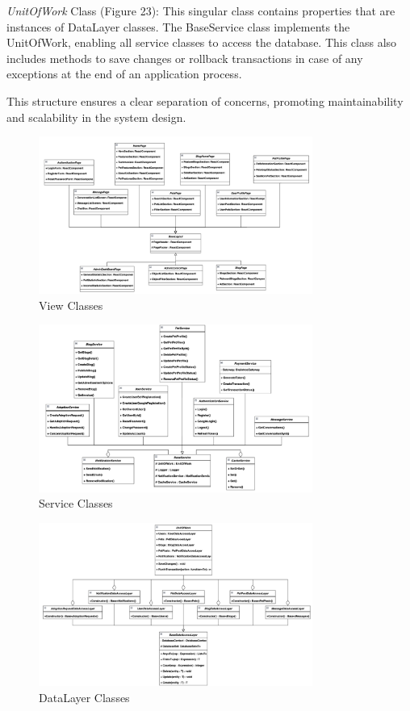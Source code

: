 \emph{UnitOfWork} Class (Figure 23): This singular class contains
properties that are instances of DataLayer classes. The BaseService
class implements the UnitOfWork, enabling all service classes to access
the database. This class also includes methods to save changes or
rollback transactions in case of any exceptions at the end of an
application process.

This structure ensures a clear separation of concerns, promoting
maintainability and scalability in the system design.

\begin{figure}[H]
  \centering
  \includegraphics[angle=-90,width=0.8\textwidth]{Figures/view_class.png}
  \caption{View Classes}
  \label{fig:view-classes}
\end{figure}
\clearpage

\begin{figure}[H]
  \centering
  \includegraphics[angle=-90,width=0.8\textwidth]{Figures/service_class.png}
  \caption{Service Classes}
  \label{fig:service-classes}
\end{figure}

\begin{figure}[H]
  \centering
  \includegraphics[angle=-90,width=0.8\textwidth]{Figures/uow_class.png}
  \caption{DataLayer Classes}
  \label{fig:datalayer-classes}
\end{figure}
\clearpage

